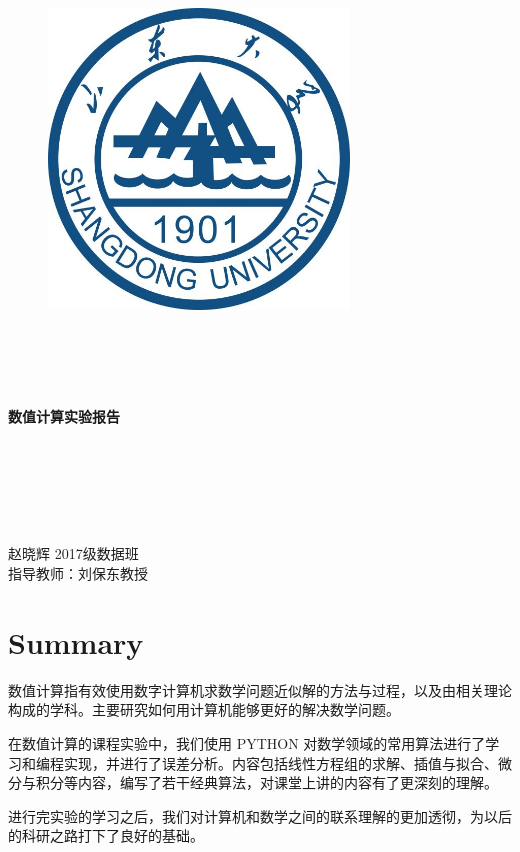\documentclass[UTF8]{ctexart}
\begin{document}
\begin{figure}[H]
 \centering
  \includegraphics[width=8cm,height=8cm]{logo.jpg}

\end{figure}

\begin{center}
~\\
~\\
~\\
~\\
\textbf{\Huge \Huge  数值计算实验报告}\\
\large
~\\
~\\
~\\
~\\
~\\
~\\
赵晓辉 \quad 2017级数据班   \\
指导教师：刘保东教授
\end{center}
\thispagestyle{empty}
\newpage


\tableofcontents
\thispagestyle{empty}
\newpage
\setcounter{page}{1}
\pagestyle{empty} 
\section*{Summary}%
数值计算指有效使用数字计算机求数学问题近似解的方法与过程，以及由相关理论构成的学科。主要研究如何用计算机能够更好的解决数学问题。

在数值计算的课程实验中，我们使用 PYTHON 对数学领域的常用算法进行了学习和编程实现，并进行了误差分析。内容包括线性方程组的求解、插值与拟合、微分与积分等内容，编写了若干经典算法，对课堂上讲的内容有了更深刻的理解。

进行完实验的学习之后，我们对计算机和数学之间的联系理解的更加透彻，为以后的科研之路打下了良好的基础。
\end{document}
